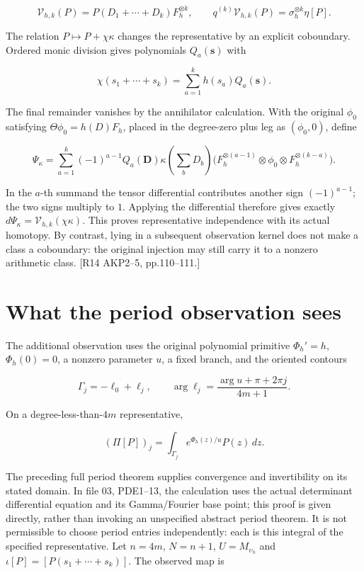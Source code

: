 \[
\mathcal V_{h,k}(P)=P(D_1+\cdots+D_k)F_h^{\otimes k},\qquad
q^{(k)}\mathcal V_{h,k}(P)=\sigma_h^{\otimes k}\eta[P].
\]

The relation \(P\mapsto P+\chi\kappa\) changes the representative by an explicit coboundary. Ordered monic division gives polynomials \(Q_a(\mathbf s)\) with

\[
\chi(s_1+\cdots+s_k)=\sum_{a=1}^kh(s_a)Q_a(\mathbf s).
\]

The final remainder vanishes by the annihilator calculation. With the original \(\phi_0\) satisfying \(\Theta\phi_0=h(D)F_h\), placed in the degree-zero plus leg as \((\phi_0,0)\), define

\[
\Psi_\kappa=\sum_{a=1}^k(-1)^{a-1}Q_a(\mathbf D)
\kappa\!\left(\sum_bD_b\right)
\bigl(F_h^{\otimes(a-1)}\otimes\phi_0
                       \otimes F_h^{\otimes(k-a)}\bigr).
\]

In the \(a\)-th summand the tensor differential contributes another sign \((-1)^{a-1}\); the two signs multiply to \(1\). Applying the differential therefore gives exactly \(d\Psi_\kappa=\mathcal V_{h,k}(\chi\kappa)\). This proves representative independence with its actual homotopy. By contrast, lying in a subsequent observation kernel does not make a class a coboundary: the original injection may still carry it to a nonzero arithmetic class. {[}R14 AKP2--5, pp.110--111.{]}

\section{What the period observation sees}\label{what-the-period-observation-sees}

The additional observation uses the original polynomial primitive \(\Phi_h'=h\), \(\Phi_h(0)=0\), a nonzero parameter \(u\), a fixed branch, and the oriented contours

\[
\Gamma_j=-\ell_0+\ell_j,\qquad
\arg\ell_j=\frac{\arg u+\pi+2\pi j}{4m+1}.
\]

On a degree-less-than-\(4m\) representative,

\[
(\Pi[P])_j=\int_{\Gamma_j}e^{\Phi_h(z)/u}P(z)\,dz.
\]

The preceding full period theorem supplies convergence and invertibility on its stated domain. In file 03, PDE1--13, the calculation uses the actual determinant differential equation and its Gamma/Fourier base point; this proof is given directly, rather than invoking an unspecified abstract period theorem. It is not permissible to choose period entries independently: each is this integral of the specified representative. Let \(n=4m\), \(N=n+1\), \(U=M_{\upsilon_h}\) and \(\iota[P]=[P(s_1+\cdots+s_k)]\). The observed map is

